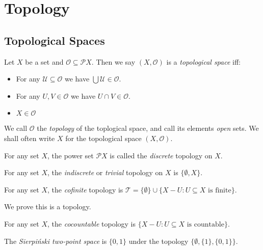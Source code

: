 
\chapter{Topology}

\section{Topological Spaces}

\begin{df}
Let $X$ be a set and $\mathcal{O} \subseteq \mathcal{P} X$. Then we say $(X, \mathcal{O})$ is a \emph{topological space} iff:
\begin{itemize}
\item For any $\mathcal{U} \subseteq \mathcal{O}$ we have $\bigcup \mathcal{U} \in \mathcal{O}$.
\item For any $U, V \in \mathcal{O}$ we have $U \cap V \in \mathcal{O}$.
\item $X \in \mathcal{O}$
\end{itemize}
We call $\mathcal{O}$ the \emph{topology} of the toplogical space, and call its elements \emph{open} sets. We shall often write $X$ for the topological space $(X, \mathcal{O})$.
\end{df}

\begin{ex}
For any set $X$, the power set $\mathcal{P} X$ is called the \emph{discrete} topology on $X$.
\end{ex}

\begin{ex}
For any set $X$, the \emph{indiscrete} or \emph{trivial} topology on $X$ is  $\{ \emptyset, X \}$.
\end{ex}

\begin{ex}
For any set $X$, the \emph{cofinite} topology is $\mathcal{T} = \{\emptyset\} \cup \{ X - U : U \subseteq X \text{ is finite} \}$.

We prove this is a topology.
\end{ex}

\begin{ex}
For any set $X$, the \emph{cocountable} topology is $\{ X - U : U \subseteq X \text{ is countable} \}$.
\end{ex}

\begin{ex}
The \emph{Sierpi\'{n}ski two-point space} is $\{0,1\}$ under the topology $\{ \emptyset, \{1\}, \{0,1\} \}$.
\end{ex}

